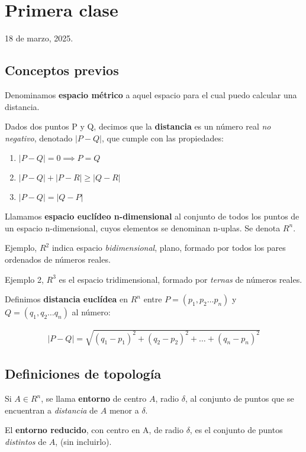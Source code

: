 \section{Primera clase}

18 de marzo, 2025.

\subsection{Conceptos previos}

Denominamos \textbf{espacio métrico}
a aquel espacio para el cual puedo calcular una distancia.

Dados dos puntos P y Q,
decimos que la \textbf{distancia} es un número real \textit{no negativo},
denotado \(|P-Q|\),
que cumple con las propiedades:

\begin{enumerate}
    \item \(|P-Q| = 0 \implies P = Q\)
    \item \(|P-Q| + |P-R| \geq |Q-R|\)
    \item \(|P-Q| = |Q-P|\)
\end{enumerate}

Llamamos \textbf{espacio euclídeo n-dimensional}
al conjunto de todos los puntos de un espacio n-dimensional,
cuyos elementos se denominan n-uplas.
Se denota \(R^{n}\).

Ejemplo, \(R^{2}\) indica espacio \textit{bidimensional},
plano,
formado por todos los pares ordenados de números reales.

Ejemplo 2, \(R^{3}\) es el espacio tridimensional,
formado por \textit{ternas} de números reales.

Definimos \textbf{distancia euclídea} en \(R^{n}\) 
entre \(P = (p_{1},p_2 \dots p_n)\) y \(Q = (q_{1},q_2 \dots q_n)\) al número:

\begin{align*}
    |P-Q| = \sqrt{(q_1 - p_1)^{2} + (q_2 - p_2)^{2} + \dots + (q_n - p_n)^{2}}
\end{align*}

\subsection{Definiciones de topología}

Si \(A \in R^{n}\), 
se llama \textbf{entorno} de centro \(A\),
radio \(\delta\),
al conjunto de puntos que se encuentran a \textit{distancia} de \(A\) menor a \(\delta\).

El \textbf{entorno reducido},
con centro en A,
de radio \(\delta\),
es el conjunto de puntos \textit{distintos} de \(A\),
(sin incluirlo).

